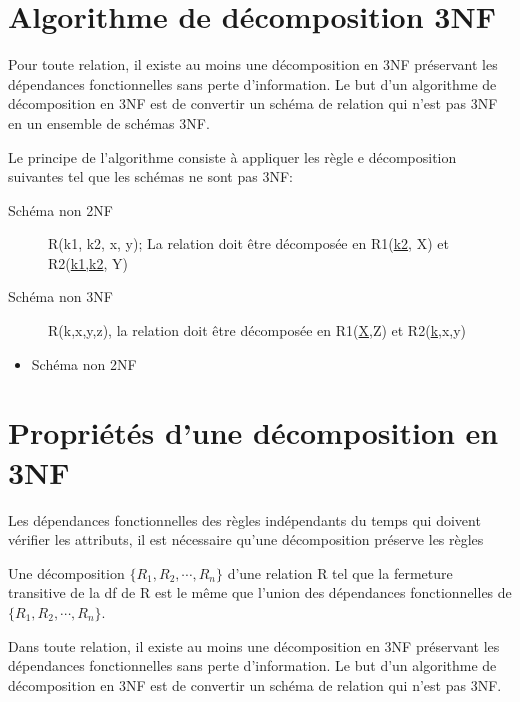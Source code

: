 \documentclass[12pt,a4paper,openany]{book}
\begin{document}
		\section{Algorithme de décomposition 3NF}
		Pour toute relation, il existe au moins une décomposition en 3NF préservant les dépendances fonctionnelles sans perte d'information. Le but d'un
		algorithme de décomposition en 3NF est de convertir un schéma de relation qui n'est pas 3NF en un ensemble de schémas 3NF.

		Le principe de l'algorithme consiste à appliquer les règle e décomposition suivantes tel que les schémas ne sont pas 3NF:
		\begin{description}
			\item[Schéma non 2NF] R(k1, k2, x, y); La relation doit être décomposée en R1(\underline{k2}, X) et R2(\underline{k1,k2}, Y)
			\item[Schéma non 3NF] R(k,x,y,z), la relation doit être décomposée en R1(\underline{X},Z) et R2(\underline{k},x,y)
		\end{description}
		\begin{itemize}
			\item Schéma non 2NF
		\end{itemize}
		\section{Propriétés d'une décomposition en 3NF}
		Les dépendances fonctionnelles des règles indépendants du temps qui doivent vérifier les attributs, il est nécessaire qu'une décomposition
		préserve les règles

		\begin{definition}
			Une décomposition $\{R_1,R_2,\cdots,R_n\}$ d'une relation R tel que la fermeture transitive de la df de R est le même que l'union des
			dépendances fonctionnelles de $\{R_1,R_2,\cdots,R_n\}$.
		\end{definition}

		Dans toute relation, il existe au moins une décomposition en 3NF préservant les dépendances fonctionnelles sans perte d'information. Le but
		d'un algorithme de décomposition en 3NF est de convertir un schéma de relation qui n'est pas 3NF.

	\appendix
	
\end{document}
